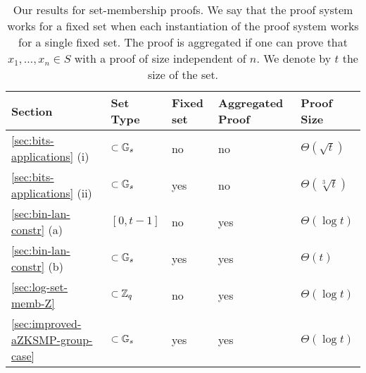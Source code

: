 
\begin{table}[h]
\begin{center}
\begin{minipage}{\textwidth}
\begin{center}
\begin{small}
\begin{tabular}{|l||l|l|l|l|}
\hline
Section & Set Type & Fixed set & Aggregated Proof & Proof Size 
\\ \hline\hline
\ref{sec:bits-applications} (i) & $\subset \mathbb{G}_s$ & no & no & $\Theta(\sqrt{t})$
\\ \hline
\ref{sec:bits-applications} (ii) & $\subset \mathbb{G}_s$ & yes & no & $\Theta(\sqrt[3]{t})$
\\ \hline
\ref{sec:bin-lan-constr} (a) & $[0,t-1]$ & no & yes & $\Theta(\log t)$
\\ \hline
\ref{sec:bin-lan-constr} (b) & $\subset \mathbb{G}_s$ & yes & yes & $\Theta(t)$
\\ \hline
\ref{sec:log-set-memb-Z} & $\subset \mathbb{Z}_q$ & no & yes & $\Theta(\log t)$
\\ \hline
\ref{sec:improved-aZKSMP-group-case} & $\subset \mathbb{G}_s$ & yes & yes & $\Theta(\log t)$
\\ \hline
\end{tabular}
\end{small}
\end{center}
\caption{Our results for set-membership proofs. We say that the proof system works for a fixed set when each instantiation of the proof system works for a single fixed set. The proof is aggregated if one can prove that $x_1,\ldots,x_n\in S$ with a proof of size independent of $n$. We denote by $t$ the size of the set.} \label{table:set-memb}
\end{minipage}
\end{center}
\end{table}
